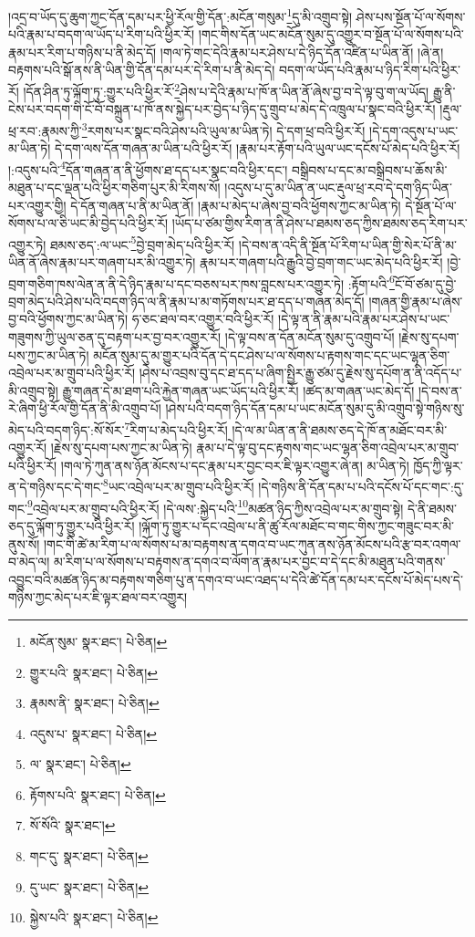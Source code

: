 །འདྲ་བ་ཡོད་དུ་ཆུག་ཀྱང་དོན་དམ་པར་ཕྱི་རོལ་གྱི་དོན་:མངོན་གསུམ་\footnote{མངོན་སུམ་  སྣར་ཐང་།  པེ་ཅིན། }དུ་མི་འགྲུབ་སྟེ། ཤེས་པས་སྔོན་པོ་ལ་སོགས་པའི་རྣམ་པ་བདག་ལ་ཡོད་པ་རིག་པའི་ཕྱིར་རོ། །གང་གིས་དོན་ཡང་མངོན་སུམ་དུ་འགྱུར་བ་སྔོན་པོ་ལ་སོགས་པའི་རྣམ་པར་རིག་པ་གཉིས་པ་ནི་མེད་དོ། །གལ་ཏེ་གང་དེའི་རྣམ་པར་ཤེས་པ་དེ་ཉིད་དོན་འཛིན་པ་ཡིན་ནོ། །ཞེ་ན། བརྟགས་པའི་སྒོ་ནས་ནི་ཡིན་གྱི་དོན་དམ་པར་དེ་རིག་པ་ནི་མེད་དེ། བདག་ལ་ཡོད་པའི་རྣམ་པ་ཉིད་རིག་པའི་ཕྱིར་རོ། །དོན་ཤིན་ཏུ་ལྐོག་ཏུ་:གྱུར་པའི་ཕྱིར་རོ་\footnote{གྱུར་པའི་  སྣར་ཐང་།  པེ་ཅིན། }ཤེས་པ་དེའི་རྣམ་པ་ཁོ་ན་ཡིན་ནོ་ཞེས་བྱ་བ་དེ་ལྟ་བུ་ག་ལ་ཡོད། རྒྱུ་ནི་ངེས་པར་བདག་གི་ངོ་བོ་བསྐྲུན་པ་ཁོ་ནས་སྐྱེད་པར་བྱེད་པ་ཉིད་དུ་གྲུབ་པ་མེད་དེ་འཁྲུལ་པ་སྣང་བའི་ཕྱིར་རོ། །རྡུལ་ཕྲ་རབ་:རྣམས་ཀྱི་\footnote{རྣམས་ནི་  སྣར་ཐང་།  པེ་ཅིན། }རགས་པར་སྣང་བའི་ཤེས་པའི་ཡུལ་མ་ཡིན་ཏེ། དེ་དག་ཕྲ་བའི་ཕྱིར་རོ། །དེ་དག་འདུས་པ་ཡང་མ་ཡིན་ཏེ། དེ་དག་ལས་དོན་གཞན་མ་ཡིན་པའི་ཕྱིར་རོ། །རྣམ་པར་རྟོག་པའི་ཡུལ་ཡང་དངོས་པོ་མེད་པའི་ཕྱིར་རོ། །:འདུས་པའི་\footnote{འདུས་པ་  སྣར་ཐང་།  པེ་ཅིན། }དོན་གཞན་ན་ནི་ཕྱོགས་ཐ་དད་པར་སྣང་བའི་ཕྱིར་དང་། བསྒྲིབས་པ་དང་མ་བསྒྲིབས་པ་ཆོས་མི་མཐུན་པ་དང་ལྡན་པའི་ཕྱིར་གཅིག་པུར་མི་རིགས་སོ། །འདུས་པ་དུ་མ་ཡིན་ན་ཡང་རྡུལ་ཕྲ་རབ་དེ་དག་ཉིད་ཡིན་པར་འགྱུར་གྱི། དེ་དོན་གཞན་པ་ནི་མ་ཡིན་ནོ། །རྣམ་པ་མེད་པ་ཞེས་བྱ་བའི་ཕྱོགས་ཀྱང་མ་ཡིན་ཏེ། དེ་སྔོན་པོ་ལ་སོགས་པ་ལ་ཅི་ཡང་མི་བྱེད་པའི་ཕྱིར་རོ། །ཡོད་པ་ཙམ་གྱིས་རིག་ན་ནི་ཤེས་པ་ཐམས་ཅད་ཀྱིས་ཐམས་ཅད་རིག་པར་འགྱུར་ཏེ། ཐམས་ཅད་:ལ་ཡང་\footnote{ལ་  སྣར་ཐང་།  པེ་ཅིན། }བྱེ་བྲག་མེད་པའི་ཕྱིར་རོ། །དེ་བས་ན་འདི་ནི་སྔོན་པོ་རིག་པ་ཡིན་གྱི་སེར་པོ་ནི་མ་ཡིན་ནོ་ཞེས་རྣམ་པར་གཞག་པར་མི་འགྱུར་ཏེ། རྣམ་པར་གཞག་པའི་རྒྱུའི་བྱེ་བྲག་གང་ཡང་མེད་པའི་ཕྱིར་རོ། །བྱེ་བྲག་གཅིག་ཁས་ལེན་ན་ནི་དེ་ཉིད་རྣམ་པ་དང་བཅས་པར་ཁས་བླངས་པར་འགྱུར་ཏེ། :རྟོག་པའི་\footnote{རྟོགས་པའི་  སྣར་ཐང་།  པེ་ཅིན། }ངོ་བོ་ཙམ་དུ་བྱེ་བྲག་མེད་པའི་ཤེས་པའི་བདག་ཉིད་ལ་ནི་རྣམ་པ་མ་གཏོགས་པར་ཐ་དད་པ་གཞན་མེད་དོ། །གཞན་གྱི་རྣམ་པ་ཞེས་བྱ་བའི་ཕྱོགས་ཀྱང་མ་ཡིན་ཏེ། ཧ་ཅང་ཐལ་བར་འགྱུར་བའི་ཕྱིར་རོ། །དེ་ལྟ་ན་ནི་རྣམ་པའི་རྣམ་པར་ཤེས་པ་ཡང་གཟུགས་ཀྱི་ཡུལ་ཅན་དུ་བརྟག་པར་བྱ་བར་འགྱུར་རོ། །དེ་ལྟ་བས་ན་དོན་མངོན་སུམ་དུ་འགྲུབ་པོ། །རྗེས་སུ་དཔག་པས་ཀྱང་མ་ཡིན་ཏེ། མངོན་སུམ་དུ་མ་གྱུར་པའི་དོན་དེ་དང་ཤེས་པ་ལ་སོགས་པ་རྟགས་གང་དང་ཡང་ལྷན་ཅིག་འབྲེལ་པར་མ་གྲུབ་པའི་ཕྱིར་རོ། །ཤེས་པ་འབྲས་བུ་དང་ཐ་དད་པ་ཞིག་སྤྱིར་རྒྱུ་ཙམ་དུ་རྗེས་སུ་དཔོག་ན་ནི་འདོད་པ་མི་འགྲུབ་སྟེ། རྒྱུ་གཞན་དེ་མ་ཐག་པའི་རྐྱེན་གཞན་ཡང་ཡོད་པའི་ཕྱིར་རོ། །ཚད་མ་གཞན་ཡང་མེད་དོ། །དེ་བས་ན་རེ་ཞིག་ཕྱི་རོལ་གྱི་དོན་ནི་མི་འགྲུབ་པོ། །ཤེས་པའི་བདག་ཉིད་དོན་དམ་པ་ཡང་མངོན་སུམ་དུ་མི་འགྲུབ་སྟེ་གཉིས་སུ་མེད་པའི་བདག་ཉིད་:སོ་སོར་\footnote{སོ་སོའི་  སྣར་ཐང་། }རིག་པ་མེད་པའི་ཕྱིར་རོ། །དེ་ལ་མ་ཡིན་ན་ནི་ཐམས་ཅད་དེ་ཁོ་ན་མཐོང་བར་མི་འགྱུར་རོ། །རྗེས་སུ་དཔག་པས་ཀྱང་མ་ཡིན་ཏེ། རྣམ་པ་དེ་ལྟ་བུ་དང་རྟགས་གང་ཡང་ལྷན་ཅིག་འབྲེལ་པར་མ་གྲུབ་པའི་ཕྱིར་རོ། །གལ་ཏེ་ཀུན་ནས་ཉོན་མོངས་པ་དང་རྣམ་པར་བྱང་བར་ཇི་ལྟར་འགྱུར་ཞེ་ན། མ་ཡིན་ཏེ། ཁྱོད་ཀྱི་ལྟར་ན་དེ་གཉིས་དང་དེ་གང་\footnote{གང་དུ་  སྣར་ཐང་།  པེ་ཅིན། }ཡང་འབྲེལ་པར་མ་གྲུབ་པའི་ཕྱིར་རོ། །དེ་གཉིས་ནི་དོན་དམ་པ་པའི་དངོས་པོ་དང་གང་:དུ་གང་\footnote{དུ་ཡང་  སྣར་ཐང་།  པེ་ཅིན། }འབྲེལ་པར་མ་གྲུབ་པའི་ཕྱིར་རོ། །དེ་ལས་:སྐྱེད་པའི་\footnote{སྐྱེས་པའི་  སྣར་ཐང་།  པེ་ཅིན། }མཚན་ཉིད་ཀྱིས་འབྲེལ་པར་མ་གྲུབ་སྟེ། དེ་ནི་ཐམས་ཅད་དུ་ལྐོག་ཏུ་གྱུར་པའི་ཕྱིར་རོ། །ལྐོག་ཏུ་གྱུར་པ་དང་འབྲེལ་པ་ནི་ཚུ་རོལ་མཐོང་བ་གང་གིས་ཀྱང་གཟུང་བར་མི་ནུས་སོ། །གང་གི་ཚེ་མ་རིག་པ་ལ་སོགས་པ་མ་བརྟགས་ན་དགའ་བ་ཡང་ཀུན་ནས་ཉོན་མོངས་པའི་རྩ་བར་འགལ་བ་མེད་ལ། མ་རིག་པ་ལ་སོགས་པ་བརྟགས་ན་དགའ་བ་ལོག་ན་རྣམ་པར་བྱང་བ་དེ་དང་མི་མཐུན་པའི་གནས་འབྱུང་བའི་མཚན་ཉིད་མ་བརྟགས་གཅིག་པུ་ན་དགའ་བ་ཡང་འཐད་པ་དེའི་ཚེ་དོན་དམ་པར་དངོས་པོ་མེད་པས་དེ་གཉིས་ཀྱང་མེད་པར་ཇི་ལྟར་ཐལ་བར་འགྱུར། 
